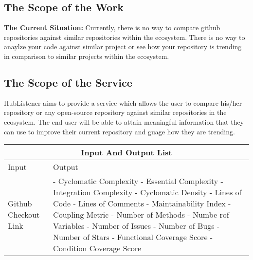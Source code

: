\documentclass{article}
\begin{document}
\subsection{The Scope of the Work}

\textbf{The Current Situation:} 
Currently, there is no way to compare github repositories against similar repositories within the ecosystem. There is no way to anaylze your code against similar project or see how your repository is trending in comparison to similar projects within the ecosystem. 


\subsection{The Scope of the Service}
HubListener aims to provide a service which allows the user to compare his/her repository or any open-source repository against similar repositories in the ecosystem. The end user will  be able to attain meaningful information that they can use to improve their current repository and guage how they are trending. 
\newline

\begin{tabular}{ |p{6cm}||p{6cm}|  }
 \hline
 \multicolumn{2}{|c|}{Input And Output List} \\
 \hline
Input  & Output \\
 \hline 
Github Checkout Link & 
- Cyclomatic  Complexity \newline
- Essential Complexity \newline
- Integration Complexity \newline
- Cyclomatic Density\newline
- Lines of Code \newline
- Lines of Comments\newline
- Maintainability Index\newline
- Coupling Metric  \newline
- Number of Methods\newline
- Numbe rof Variables\newline 
- Number of Issues\newline
- Number of Bugs\newline
- Number of Stars\newline
- Functional Coverage Score\newline
- Condition Coverage Score \\
\hline
\end{tabular}
\end{document}
